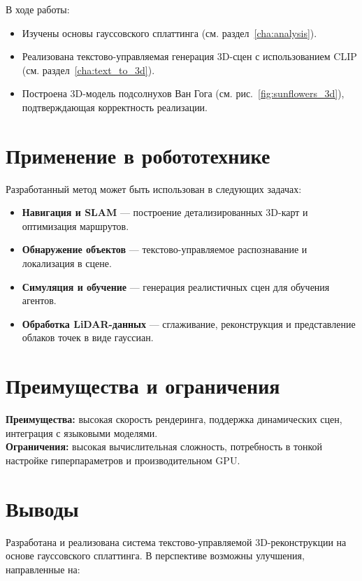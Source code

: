 \Conclusion

В ходе работы:

\begin{itemize}
    \item Изучены основы гауссовского сплаттинга (см. раздел~\ref{cha:analysis}).
    \item Реализована текстово-управляемая генерация 3D-сцен с использованием CLIP (см. раздел~\ref{cha:text_to_3d}).
    \item Построена 3D-модель подсолнухов Ван Гога (см. рис.~\ref{fig:sunflowers_3d}), подтверждающая корректность реализации.
\end{itemize}

\section*{Применение в робототехнике}

Разработанный метод может быть использован в следующих задачах:

\begin{itemize}
    \item \textbf{Навигация и SLAM} — построение детализированных 3D-карт и оптимизация маршрутов.
    \item \textbf{Обнаружение объектов} — текстово-управляемое распознавание и локализация в сцене.
    \item \textbf{Симуляция и обучение} — генерация реалистичных сцен для обучения агентов.
    \item \textbf{Обработка LiDAR-данных} — сглаживание, реконструкция и представление облаков точек в виде гауссиан.
\end{itemize}

\section*{Преимущества и ограничения}

\textbf{Преимущества:} высокая скорость рендеринга, поддержка динамических сцен, интеграция с языковыми моделями.\\
\textbf{Ограничения:} высокая вычислительная сложность, потребность в тонкой настройке гиперпараметров и производительном GPU.

\section*{Выводы}

Разработана и реализована система текстово-управляемой 3D-реконструкции на основе гауссовского сплаттинга. В перспективе возможны улучшения, направленные на:

